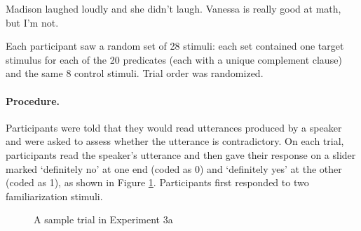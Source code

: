 \documentclass{language}
\newcommand{\6}{\mbox{$[\hspace*{-.6mm}[$}}
\newcommand{\9}{\mbox{$]\hspace*{-.6mm}]$}}
\begin{document}
\begin{exe}

\ex\label{control-bad} Madison laughed loudly and she didn't laugh.
\ex\label{control-good}  Vanessa is really good at math, but I'm not.
\end{exe}

Each participant saw a random set of 28 stimuli: each set contained one target stimulus for each of the 20 predicates (each with a unique complement clause) and the same 8 control stimuli. Trial order was randomized.


\paragraph{Procedure.} Participants were told that they would read utterances produced by a speaker and were asked to assess whether the utterance is contradictory. On each trial, participants read the speaker's utterance and then gave their response on a slider marked `definitely no' at one end (coded as 0) and `definitely yes' at the other (coded as 1), as shown in Figure \ref{f-trial-exp2}. Participants first responded to two familiarization stimuli.


\begin{figure}[h!]
\begin{center}
\end{center}
\caption{A sample trial in Experiment 3a}\label{f-trial-exp2}
\end{figure}
\end{document}
